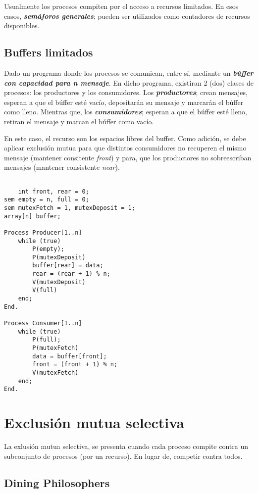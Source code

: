 \documentclass[a4paper, 11pt]{book}
\begin{document}
Usualmente los procesos compiten por el acceso a recursos limitados. En esos casos, \textbf{\emph{semáforos generales}}; pueden ser utilizados como contadores de recursos disponibles.

\subsection{Buffers limitados}

Dado un programa donde los procesos se comunican, entre sí, mediante un \textbf{\emph{búffer con capacidad para n mensaje}}. En dicho programa, existiran 2 (dos) clases de procesos: los productores y los consumidores. Los \textbf{\emph{productores}}; crean mensajes, esperan a que el búffer esté vacío, depositarán su mensaje y marcarán el búffer como lleno. Mientras que, los \textbf{\emph{consumidores}}; esperan a que el búffer esté lleno, retiran el mensaje y marcan el búffer como vacío.

En este caso, el recurso son los espacios libres del buffer. Como adición, se debe aplicar exclusión mutua para que distintos consumidores no recuperen el mismo mensaje (mantener consitente \emph{front}) y para, que los productores no sobreescriban mensajes (mantener consistente \emph{near}).

\begin{lstlisting}

    int front, rear = 0;
sem empty = n, full = 0;
sem mutexFetch = 1, mutexDeposit = 1;
array[n] buffer; 

Process Producer[1..n]
    while (true)
        P(empty);
        P(mutexDeposit)
        buffer[rear] = data;
        rear = (rear + 1) % n;
        V(mutexDeposit)
        V(full)
    end;
End.

Process Consumer[1..n]
    while (true)
        P(full);
        P(mutexFetch)
        data = buffer[front];
        front = (front + 1) % n;
        V(mutexFetch)
    end;
End.
\end{lstlisting}

\section{Exclusión mutua selectiva}

La exlusión mutua selectiva, se presenta cuando cada proceso compite contra un subconjunto de procesos (por un recurso). En lugar de, competir contra todos.

\subsection{Dining Philosophers}
\end{document}
